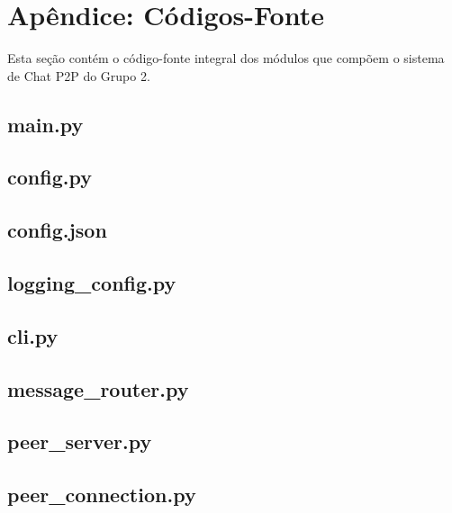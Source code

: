 \documentclass[12pt,a4paper]{article}
\begin{document}
\newpage
\section{Apêndice: Códigos-Fonte}

Esta seção contém o código-fonte integral dos módulos que compõem o sistema de Chat P2P do Grupo 2.

\subsection{main.py}


\newpage
\subsection{config.py}


\newpage
\subsection{config.json}


\newpage
\subsection{logging\_config.py}


\newpage
\subsection{cli.py}


\newpage
\subsection{message\_router.py}


\newpage
\subsection{peer\_server.py}


\newpage
\subsection{peer\_connection.py}

\end{document}
